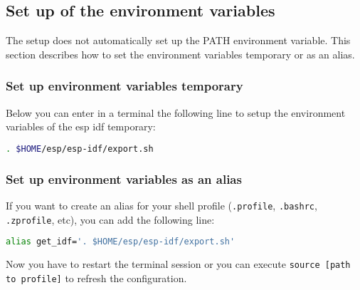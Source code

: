 \subsection{Set up of the environment variables}
The setup does not automatically set up the PATH environment variable. This section describes
how to set the environment variables temporary or as an alias. 

\subsubsection{Set up environment variables temporary}
Below you can enter in a terminal the following line to setup the environment variables of the esp idf temporary:
\begin{lstlisting}[language=bash]
. $HOME/esp/esp-idf/export.sh
\end{lstlisting}


\subsubsection{Set up environment variables as an alias}
If you want to create an alias for your shell profile (\texttt{.profile}, \texttt{.bashrc}, \texttt{.zprofile}, etc), you can add the following line:
\begin{lstlisting}[language=bash]
alias get_idf='. $HOME/esp/esp-idf/export.sh'
\end{lstlisting}

Now you have to restart the terminal session or you can execute \texttt{source  [path to profile]} to refresh the configuration. 

